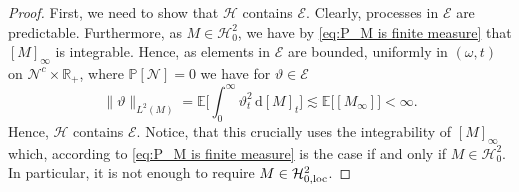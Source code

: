 \documentclass[11pt,a4paper,twoside,openany]{report}
\numberwithin{equation}{section}
\newcommand{\diff}{\mathrm{d}}
\theoremstyle{plain} %
\theoremstyle{definition} %
\theoremstyle{remark} %
\begin{document}
\begin{proof}
 
      First, we need to show that \(\mathcal{H}\) contains \(\mathcal{E}\). Clearly, processes in \(\mathcal{E}\) are predictable. Furthermore, as \(M\in\mathcal{H}^2_0\), we have by \eqref{eq:P_M is finite measure} that \([M]_\infty\) is integrable. Hence, as elements in \(\mathcal{E}\) are bounded, uniformly in \((\omega, t)\) on \(\mathcal{N}^c\times\mathbb{R}_+\), where \(\mathbb{P}[\mathcal{N}]=0\) we have for \(\vartheta\in\mathcal{E}\)
    \begin{equation*}
        \lVert\vartheta\rVert_{L^2(M)}=\mathbb{E}\bigg[\int_0^{\infty}\vartheta_t^2\,\diff [M]_t\bigg]\lesssim\mathbb{E}\big[[M_\infty]\big]<\infty.
    \end{equation*}
    Hence, \(\mathcal{H}\) contains \(\mathcal{E}\). Notice, that this crucially uses the integrability of \([M]_\infty\) which, according to \eqref{eq:P_M is finite measure} is the case if and only if \(M\in\mathcal{H}^2_0\). In particular, it is not enough to require \(M\in\mathcal{H}_{0,\rm{loc}}^2\).  
    

\end{proof}
\end{document}
